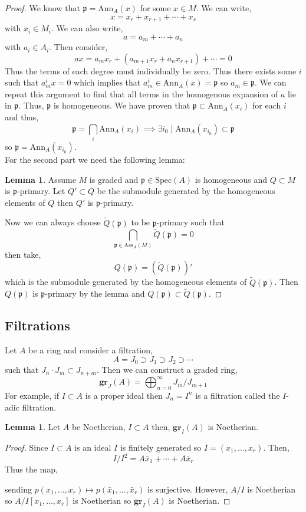 \documentclass[12pt]{article}
\newcommand{\Ann}[2]{\mathrm{Ann}_{#1}\left(#2\right)}
\newcommand{\Ass}[2]{\mathrm{Ass}_{#1}\left( #2 \right)}
\newcommand{\spec}[1]{\mathrm{Spec}\left( #1 \right)}
\newcommand{\gr}[2]{\mathbf{gr}_{#1}\left(#2\right)}
\newcommand{\p}{\mathfrak{p}}
\theoremstyle{remark}
\theoremstyle{definition}
\newtheorem{lemma}[theorem]{Lemma}
\begin{document}
\begin{proof}
We know that $\p = \Ann{A}{x}$ for some $x \in M$. We can write, 
\[ x = x_r + x_{r+1} + \cdots + x_s \]
with $x_i \in M_i$. We can also write,
\[ a = a_m + \cdots + a_n \]
with $a_i \in A_i$. Then consider,
\[ ax = a_m x_r + \left( a_{m+1} x_r + a_n x_{r+1}  \right) + \cdots = 0 \]
Thus the terms of each degree must individually be zero. Thus there exists some $i$ such that $a^i_m x = 0$ which implies that $a_m^i \in \Ann{A}{x} = \p$ so $a_m \in \p$. We can repeat this argument to find that all terms in the homogenous expansion of $a$ lie in $\p$. Thus, $\p$ is homogeneous. We have proven that $\p \subset \Ann{A}{x_i}$ for each $i$ and thus,
\[ \p = \bigcap_i \Ann{A}{x_i} \implies \exists i_0 \mid \Ann{A}{x_{i_0}} \subset \p \]
so $\p = \Ann{A}{x_{i_0}}$. 
\bigskip\\
For the second part we need the following lemma:
\begin{lemma}
Assume $M$ is graded and $\p \in \spec{A}$ is homogeneous and $Q \subset M$ is $\p$-primary. Let $Q' \subset Q$ be the submodule generated by the homogeneous elements of $Q$ then $Q'$ is $\p$-primary.
\end{lemma}
Now we can always choose $\tilde{Q}(\p)$ to be $\p$-primary such that
\[ \bigcap_{\p \in \Ass{A}{M}} \tilde{Q}(\p) = 0 \]
then take,
\[ Q(\p) = \left( \tilde{Q}(\p) \right)' \]
which is the submodule generated by the homogeneous elements of $\tilde{Q}(\p)$. Then $Q(\p)$ is $\p$-primary by the lemma and $Q(\p) \subset \tilde{Q}(\p)$.  
\end{proof}

\subsection{Filtrations}
Let $A$ be a ring and consider a filtration,
\[ A = J_0 \supset J_1 \supset J_2 \supset \cdots \]
such that $J_n \cdot J_m \subset J_{n + m}$. Then we can construct a graded ring,
\[ \gr{J}{A} = \bigoplus_{n = 0}^\infty J_m / J_{m+1} \]
For example, if $I \subset A$ is a proper ideal then $J_n = I^n$ is a filtration called the $I$-adic filtration. 

\begin{lemma}
Let $A$ be Noetherian, $I \subset A$ then, $\gr{I}{A}$ is Noetherian.
\end{lemma}

\begin{proof}
Since $I \subset A$ is an ideal $I$ is finitely generated so $I = (x_1, \dots, x_r)$. Then,
\[ I / I^2 = A \bar{x}_1 + \cdots + A \bar{x}_r \]
Thus the map,
\begin{center}
\end{center}
sending $p(x_1, \dots, x_r) \mapsto p(\bar{x}_1, \dots, \bar{x}_r)$
is surjective. However, $A / I$ is Noetherian so $A / I [x_1, \dots, x_r]$ is Noetherian so $\gr{I}{A}$ is Noetherian. 
\end{proof}
\end{document}
